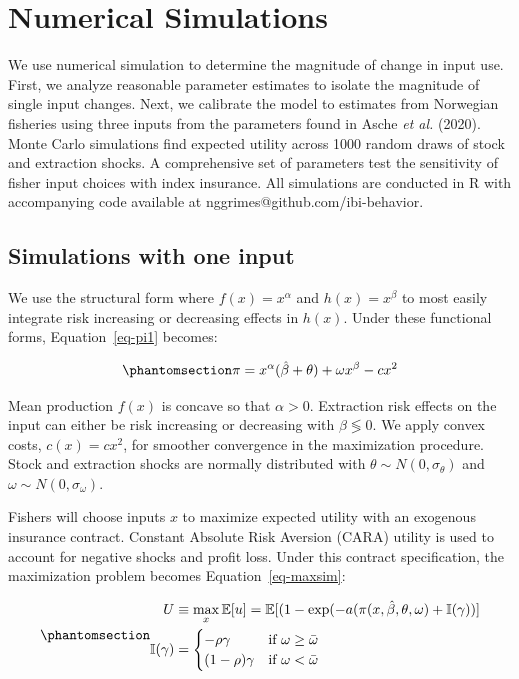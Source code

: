 \documentclass[
  letterpaper,
  DIV=11,
  numbers=noendperiod]{scrartcl}
\theoremstyle{plain}
\theoremstyle{plain}
\theoremstyle{remark}
\begin{document}
\section{Numerical Simulations}\label{sec-sim}

We use numerical simulation to determine the magnitude of change in
input use. First, we analyze reasonable parameter estimates to isolate
the magnitude of single input changes. Next, we calibrate the model to
estimates from Norwegian fisheries using three inputs from the
parameters found in Asche \emph{et al.} (2020). Monte Carlo simulations
find expected utility across 1000 random draws of stock and extraction
shocks. A comprehensive set of parameters test the sensitivity of fisher
input choices with index insurance. All simulations are conducted in R
with accompanying code available at nggrimes@github.com/ibi-behavior.

\subsection{Simulations with one
input}\label{simulations-with-one-input}

We use the structural form where \(f(x)=x^\alpha\) and \(h(x)=x^\beta\)
to most easily integrate risk increasing or decreasing effects in
\(h(x)\). Under these functional forms, Equation~\ref{eq-pi1} becomes:

\begin{equation}\phantomsection\label{eq-sim}{
\pi=x^\alpha(\hat\beta+\theta)+\omega x^\beta-cx^2
}\end{equation}

Mean production \(f(x)\) is concave so that \(\alpha>0\). Extraction
risk effects on the input can either be risk increasing or decreasing
with \(\beta\lessgtr0\). We apply convex costs, \(c(x)=cx^2\), for
smoother convergence in the maximization procedure. Stock and extraction
shocks are normally distributed with \(\theta\sim N(0,\sigma_{\theta})\)
and \(\omega\sim N(0,\sigma_{\omega})\).

Fishers will choose inputs \(x\) to maximize expected utility with an
exogenous insurance contract. Constant Absolute Risk Aversion (CARA)
utility is used to account for negative shocks and profit loss. Under
this contract specification, the maximization problem becomes
Equation~\ref{eq-maxsim}:

\begin{equation}\phantomsection\label{eq-maxsim}{
\begin{aligned}
U&\equiv\max_{x}\mathbb{E}[u]=\mathbb{E}[(1-\exp(-a(\pi(x,\hat\beta,\theta,\omega)+\mathbb{I}(\gamma))]\\
\mathbb{I}(\gamma)&=\begin{cases}-\rho\gamma & \text{if } \omega\ge \bar\omega\\
(1-\rho)\gamma & \text{if } \omega<\bar\omega
\end{cases}
\end{aligned}
}\end{equation}
\end{document}
